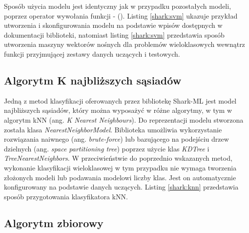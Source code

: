 Sposób użycia modelu jest identyczny jak w przypadku pozostałych modeli, poprzez operator wywołania funkcji - (). Listing \ref{shark:svm} ukazuje przykład utworzenia i skonfigurowania modelu na podstawie wpisów dostępnych w dokumentacji biblioteki, natomiast listing \ref{shark:svm} przedstawia sposób utworzenia maszyny wektorów nośnych dla problemów wieloklasowych wewnątrz funkcji przyjmującej zestawy danych uczących i testowych.



\subsection{Algorytm K najbliższych sąsiadów}

Jedną z metod klasyfikacji oferowanych przez bibliotekę Shark-ML jest model najbliższych sąsiadów, który można wyposażyć w różne algorytmy, w tym w algorytm kNN (ang. \textit{K Nearest Neighbours}). Do reprezentacji modelu stworzona została klasa \textit{NearestNeighborModel}. Biblioteka umożliwia wykorzystanie rozwiązania naiwnego (ang. \textit{brute-force}) lub bazującego na podejściu drzew dzielnych (ang. \textit{space partitioning tree}) poprzez użycie klas \textit{KDTree} i \textit{TreeNearestNeighbors}. W przeciwieństwie do poprzednio wskazanych metod, wykonanie klasyfikacji wieloklasowej w tym przypadku nie wymaga tworzenia złożonych modeli lub podawania modelowi liczby klas. Jest on automatycznie konfigurowany na podstawie danych uczących. Listing \ref{shark:knn} przedstawia sposób przygotowania klasyfikatora kNN.


\subsection{Algorytm zbiorowy}

